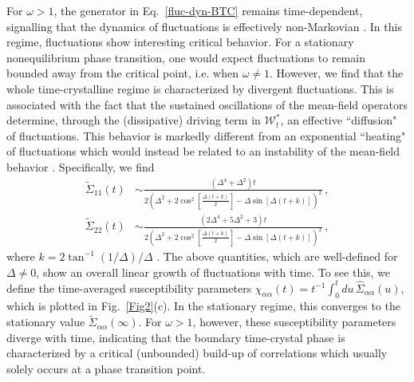 \documentclass[prl,superscriptaddress,showpacs,longbibliography,reprint]{revtex4-2}
\begin{document}
For $\omega>1$, the generator in Eq.~\eqref{fluc-dyn-BTC} remains time-dependent, signalling that the dynamics of fluctuations is effectively non-Markovian \cite{chruscinski2010}. In this regime, fluctuations show interesting critical behavior. For a stationary nonequilibrium phase transition, one would expect fluctuations to remain bounded away from the critical point, i.e. when $\omega\neq1$. However, we find that the whole time-crystalline regime is characterized by divergent fluctuations. This is associated with the fact that the sustained oscillations of the mean-field operators determine, through the (dissipative) driving term in  $\mathcal{W}^*_t$, an effective ``diffusion" of fluctuations. This behavior is markedly different from an exponential ``heating" of fluctuations which would instead be related to an instability of the mean-field behavior \cite{benatti2016}. Specifically, we find 
\begin{equation}
\begin{split}
\tilde{\Sigma}_{11}(t)&\sim \frac{\left(\Delta^4+\Delta^2\right) t}{2\left(\Delta^2+2\cos^2\left[\frac{\Delta( t+k)}{2}\right]-\Delta\sin\left[\Delta ( t+k)\right]\right)^2}\, ,\\
\tilde{\Sigma}_{22}(t)&\sim \frac{\left(2\Delta^4+5\Delta^2+3\right) t}{2\left(\Delta^2+2\cos^2\left[\frac{\Delta( t+k)}{2}\right]-\Delta\sin\left[\Delta ( t+k)\right]\right)^2}\, ,
\end{split}
    \label{fluct-time-cryst}
\end{equation}
where $k=2\tan^{-1}(1/\Delta)/\Delta$ \cite{SM}. The above quantities, which are well-defined for $\Delta\neq0$, show an overall linear growth of fluctuations  with time. To see this, 
we define the time-averaged susceptibility parameters
$\chi_{\alpha\alpha}(t)= t^{-1}\int_0^t du \, \hat{\Sigma}_{\alpha\alpha}(u)$, which is plotted in Fig.~\ref{Fig2}(c). In the stationary regime, this converges to the stationary value $\tilde{\Sigma}_{\alpha\alpha}(\infty)$. For $\omega>1$, however, these susceptibility parameters diverge with time, indicating that the boundary time-crystal phase is characterized by a critical (unbounded) build-up of correlations which usually solely occurs at a phase transition point. \vspace{10pt}
\end{document}
